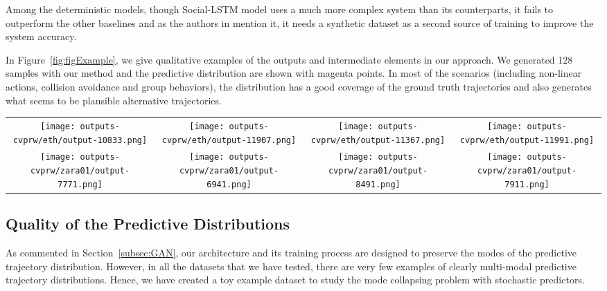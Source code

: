 \documentclass[10pt,twocolumn,letterpaper]{article}
\begin{document}
Among the deterministic models, though Social-LSTM model uses a much more complex system than its counterparts, it fails to outperform the other baselines and as the authors in \cite{SocialGAN2018} mention it, it needs a synthetic dataset as a second source of training to improve the system accuracy.

In Figure~\ref{fig:figExample}, we give qualitative examples of the outputs and intermediate elements in our approach. We generated 128 samples with our method and the predictive distribution are shown with magenta points. In most of the scenarios (including non-linear actions, collision avoidance and group behaviors), the distribution has a good coverage of the ground truth trajectories and also generates what seems to be plausible alternative trajectories.







\begin{figure*}
\begin{center}
\begin{tabular}{cccc}
	\texttt{[image: outputs-cvprw/eth/output-10833.png]}&
	\texttt{[image: outputs-cvprw/eth/output-11907.png]}&
	\texttt{[image: outputs-cvprw/eth/output-11367.png]}&	
	\texttt{[image: outputs-cvprw/eth/output-11991.png]}\\
	\texttt{[image: outputs-cvprw/zara01/output-7771.png]}&	
	\texttt{[image: outputs-cvprw/zara01/output-6941.png]}&
	\texttt{[image: outputs-cvprw/zara01/output-8491.png]}&
	\texttt{[image: outputs-cvprw/zara01/output-7911.png]}\\
\end{tabular}
\end{center}
\caption{In this figure, we illustrate our sample outputs (in magenta color).
The observed trajectories are shown in blue and ground truth prediction and constant-velocity predictions are shown in cyan and orange lines, respectively. [Best viewed in color.]}
\label{fig:figExample}
\vspace{-0.1cm}
\end{figure*}

\subsection{Quality of the Predictive Distributions}
As commented in Section~\ref{subsec:GAN}, our architecture and its training process are designed to preserve the modes of the predictive trajectory distribution. However, in all the datasets that we have tested, there are very few examples of clearly multi-modal predictive trajectory distributions. Hence, we have created a toy example dataset to study the mode collapsing problem with stochastic predictors.
\end{document}
